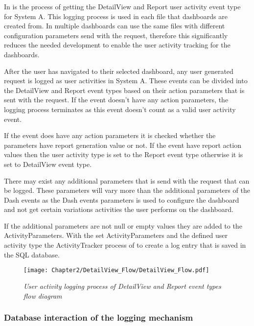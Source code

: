 In  is the process of getting the DetailView and Report user activity event type for System A. This logging process is used in each file that dashboards are created from. In  multiple dashboards can use the same files with different configuration parameters send with the request, therefore this significantly reduces the needed development to enable the user activity tracking for the dashboards.\par After the user has navigated to their selected dashboard, any user generated request is logged as user activities in System A. These events can be divided into the DetailView and Report event types based on their action parameters that is sent with the request. If the event doesn't have any action parameters, the logging process terminates as this event doesn't count as a valid user activity event.\par If the event does have any action parameters it is checked whether the parameters have report generation value or not. If the event have report action values then the user activity type is set to the Report event type otherwise it is set to DetailView event type.\par There may exist any additional parameters that is send with the request that can be logged. These parameters will vary more than the additional parameters of the Dash events as the Dash events parameters is used to configure the dashboard and not get certain variations activities the user performs on the dashboard.\par If the additional parameters are not null or empty values they are added to the ActivityParameters. With the set ActivityParameters and the defined user activity type the ActivityTracker process of  to create a log entry that is saved in the SQL database.

\begin{figure}[!htb] %
	\centering %
	\texttt{[image: Chapter2/DetailView\_Flow/DetailView\_Flow.pdf]}
	\caption[User activity logging of DetailView and Report event types]
	{\textit{User activity logging process of DetailView and Report event types flow diagram}}\label{fig:ch2_DetailView_Flow}
\end{figure}

\clearpage

\subsubsection{Database interaction of the logging mechanism}\label{sec:CH2_SystemA_DB_Interaction_FlowDiagram}

